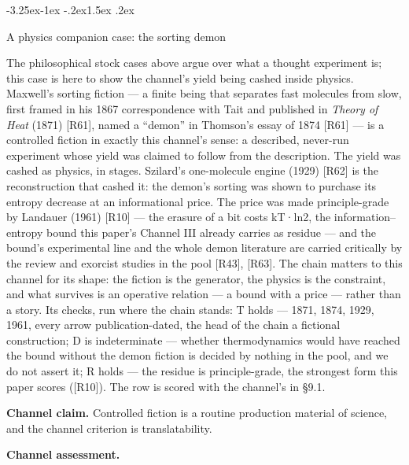 \documentclass[11pt,a4paper]{article}
\makeatletter
\renewcommand\subsection{\@startsection{subsection}{2}{\z@}%
  {-3.25ex\@plus -1ex \@minus -.2ex}{1.5ex \@plus .2ex}%
  {\normalfont\large\bfseries\raggedright}}
\makeatother
\begin{document}
\subsection{A physics companion case: the sorting demon}

The philosophical stock cases above argue over what a thought experiment is; this case is here to show the channel's yield being cashed inside physics. Maxwell's sorting fiction — a finite being that separates fast molecules from slow, first framed in his 1867 correspondence with Tait and published in \textit{Theory of Heat} (1871) [R61], named a ``demon'' in Thomson's essay of 1874 [R61] — is a controlled fiction in exactly this channel's sense: a described, never-run experiment whose yield was claimed to follow from the description. The yield was cashed as physics, in stages. Szilard's one-molecule engine (1929) [R62] is the reconstruction that cashed it: the demon's sorting was shown to purchase its entropy decrease at an informational price. The price was made principle-grade by Landauer (1961) [R10] — the erasure of a bit costs kT·ln2, the information–entropy bound this paper's Channel III already carries as residue — and the bound's experimental line and the whole demon literature are carried critically by the review and exorcist studies in the pool [R43], [R63]. The chain matters to this channel for its shape: the fiction is the generator, the physics is the constraint, and what survives is an operative relation — a bound with a price — rather than a story. Its checks, run where the chain stands: T holds — 1871, 1874, 1929, 1961, every arrow publication-dated, the head of the chain a fictional construction; D is indeterminate — whether thermodynamics would have reached the bound without the demon fiction is decided by nothing in the pool, and we do not assert it; R holds — the residue is principle-grade, the strongest form this paper scores ([R10]). The row is scored with the channel's in §9.1.

\textbf{Channel claim.} Controlled fiction is a routine production material of science, and the channel criterion is translatability.

\textbf{Channel assessment.}
\end{document}
